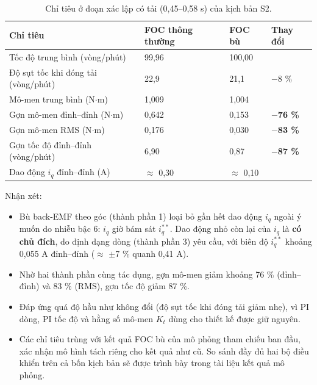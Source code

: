 \begin{table}[H]
\centering\small
\caption{Chỉ tiêu ở đoạn xác lập có tải (0,45–0,58 s) của kịch bản S2.}\label{tab:6.4}
\begin{tabular}{@{}llll@{}}
\toprule
Chỉ tiêu & FOC thông thường & FOC bù & Thay đổi \\ \midrule
Tốc độ trung bình (vòng/phút) & 99,96 & 100,00 &  \\
Độ sụt tốc khi đóng tải (vòng/phút) & 22,9 & 21,1 & $-$8 \% \\
Mô-men trung bình (N$\cdot$m) & 1,009 & 1,004 &  \\
Gợn mô-men đỉnh–đỉnh (N$\cdot$m) & 0,642 & 0,153 & \textbf{$-$76 \%} \\
Gợn mô-men RMS (N$\cdot$m) & 0,176 & 0,030 & \textbf{$-$83 \%} \\
Gợn tốc độ đỉnh–đỉnh (vòng/phút) & 6,90 & 0,87 & \textbf{$-$87 \%} \\
Dao động $i_q$ đỉnh–đỉnh (A) & $\approx$ 0,30 & $\approx$ 0,10 &  \\
\bottomrule
\end{tabular}
\end{table}

Nhận xét:

\begin{itemize}[leftmargin=*]
\item Bù back-EMF theo góc (thành phần 1) loại bỏ gần hết dao động $i_q$ ngoài ý muốn do nhiễu bậc 6: $i_q$ giờ bám sát $i_q^{**}$. Dao động nhỏ còn lại của $i_q$ là \textbf{có chủ đích}, do định dạng dòng (thành phần 3) yêu cầu, với biên độ $i_q^{**}$ khoảng 0,055 A đỉnh–đỉnh ($\approx$ $\pm$7 \% quanh 0,41 A).
\item Nhờ hai thành phần cùng tác dụng, gợn mô-men giảm khoảng 76 \% (đỉnh–đỉnh) và 83 \% (RMS), gợn tốc độ giảm 87 \%.
\item Đáp ứng quá độ hầu như không đổi (độ sụt tốc khi đóng tải giảm nhẹ), vì PI dòng, PI tốc độ và hằng số mô-men $K_t$ dùng cho thiết kế được giữ nguyên.
\item Các chỉ tiêu trùng với kết quả FOC bù của mô phỏng tham chiếu ban đầu, xác nhận mô hình tách riêng cho kết quả như cũ. So sánh đầy đủ hai bộ điều khiển trên cả bốn kịch bản sẽ được trình bày trong tài liệu kết quả mô phỏng.
\end{itemize}


